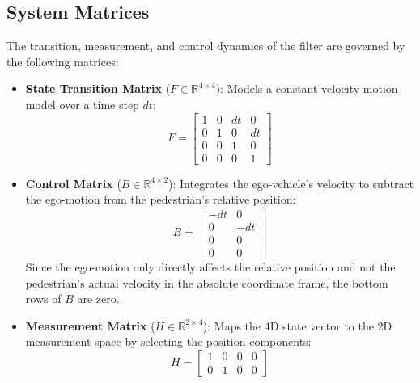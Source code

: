 \subsection{System Matrices}

The transition, measurement, and control dynamics of the filter are governed by the following matrices:

\begin{itemize}
    \item \textbf{State Transition Matrix} ($F \in \mathbb{R}^{4 \times 4}$): Models a constant velocity motion model over a time step $dt$:
    \begin{equation}
        F = \begin{bmatrix}
            1 & 0 & dt & 0 \\
            0 & 1 & 0 & dt \\
            0 & 0 & 1 & 0 \\
            0 & 0 & 0 & 1
        \end{bmatrix}
    \end{equation}

    \item \textbf{Control Matrix} ($B \in \mathbb{R}^{4 \times 2}$): Integrates the ego-vehicle's velocity to subtract the ego-motion from the pedestrian's relative position:
    \begin{equation}
        B = \begin{bmatrix}
            -dt & 0 \\
            0 & -dt \\
            0 & 0 \\
            0 & 0
        \end{bmatrix}
    \end{equation}
    Since the ego-motion only directly affects the relative position and not the pedestrian's actual velocity in the absolute coordinate frame, the bottom rows of $B$ are zero.

    \item \textbf{Measurement Matrix} ($H \in \mathbb{R}^{2 \times 4}$): Maps the 4D state vector to the 2D measurement space by selecting the position components:
    \begin{equation}
        H = \begin{bmatrix}
            1 & 0 & 0 & 0 \\
            0 & 1 & 0 & 0
        \end{bmatrix}
    \end{equation}


\end{itemize}
